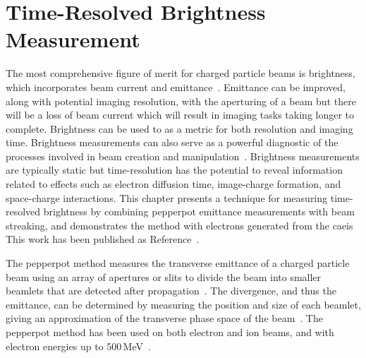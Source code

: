 \chapter{Time-Resolved Brightness Measurement}\label{chapter:brightness}

The most comprehensive figure of merit for charged particle beams is brightness, which incorporates beam current and emittance~\cite{reiser_theory_2008}.
Emittance can be improved, along with potential imaging resolution, with the aperturing of a beam but there will be a loss of beam current which will result in imaging tasks taking longer to complete.
Brightness can be used to as a metric for both resolution and imaging time.
Brightness measurements can also serve as a powerful diagnostic of the processes involved in beam creation and manipulation~\cite{mills_brightness_1980,qiang_three-dimensional_2006,bazarov_maximum_2009}.
Brightness measurements are typically static but time-resolution has the potential to reveal information related to effects such as electron diffusion time, image-charge formation, and space-charge interactions.
This chapter presents a technique for measuring time-resolved brightness by combining pepperpot emittance measurements with beam streaking, and demonstrates the method with electrons generated from the \gls{caeis}
This work has been published as Reference~\cite{torrance_time-resolved_2018}.

The pepperpot method measures the transverse emittance of a charged particle beam using an array of apertures or slits to divide the beam into smaller beamlets that are detected after propagation~\cite{collins_extraction_1964,van_steenbergen_evaluation_1967,wang_beam_1991,brunetti_low_2010}.
The divergence, and thus the emittance, can be determined by measuring the position and size of each beamlet, giving an approximation of the transverse phase space of the beam~\cite{zhang_emittance_1996,wang_beam_1991}.
The pepperpot method has been used on both electron and ion beams, and with electron energies up to 500\,MeV~\cite{delerue_single-shot_2010}.

